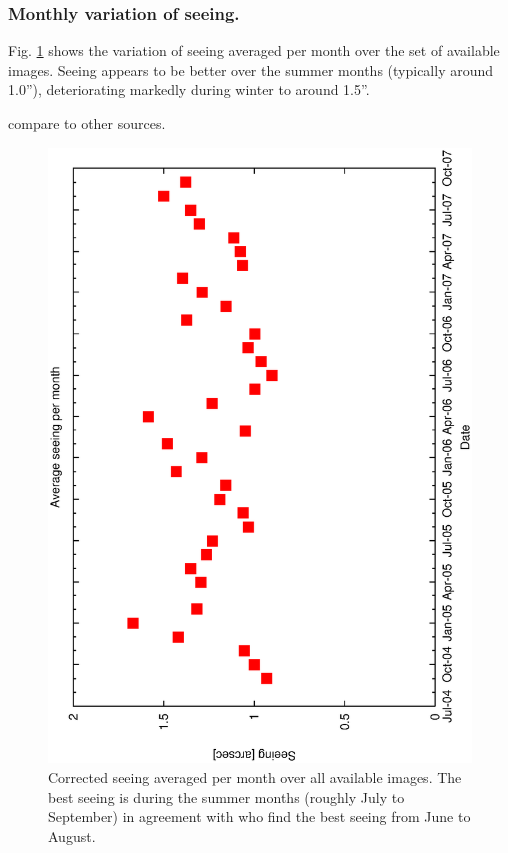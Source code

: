 {{\subsubsection{Monthly variation of seeing.}

Fig. \ref{fig:monthly_seeing} shows the variation of seeing averaged per month over the set of available images. Seeing appears to be better over the summer months (typically around 1.0''), deteriorating markedly during winter to around 1.5''. 

compare to other sources.

\begin{figure}[htbp]
\begin{center}
    \includegraphics[scale=0.4, angle=-90]{figures/ecs/corr_see_monthly.eps}
\end{center} 
\caption[Corrected seeing avergared per month over available images.]
{Corrected seeing averaged per month over all available images. The best seeing is during the summer months (roughly July to September) in agreement with \citet{munoz97nighttime} who find the best seeing from June to August.}
\label{fig:monthly_seeing}
\end{figure}

}}
